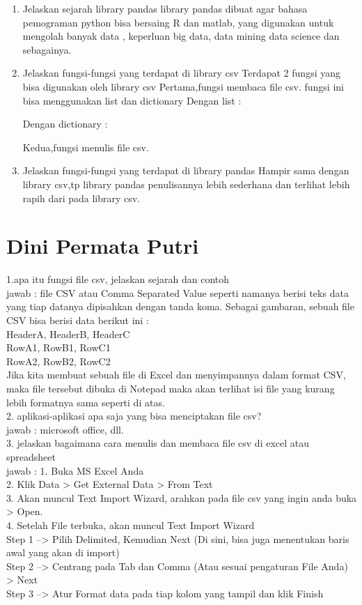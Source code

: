 \begin{enumerate}
    \item Jelaskan sejarah library pandas
    library pandas dibuat agar bahasa pemograman python bisa bersaing R dan matlab, yang digunakan untuk mengolah banyak data , keperluan big data, data mining data science dan sebagainya.
    \item Jelaskan fungsi-fungsi yang terdapat di library csv
    Terdapat 2 fungsi yang bisa digunakan oleh library csv
    Pertama,fungsi membaca file csv.
    fungsi ini bisa menggunakan list dan dictionary
    Dengan list :
    
    Dengan dictionary :
    
    Kedua,fungsi menulis file csv.
    
    \item Jelaskan fungsi-fungsi yang terdapat di library pandas
    Hampir sama dengan library csv,tp library pandas penulisannya lebih sederhana dan terlihat lebih rapih dari pada library csv.
    
\end{enumerate}
\section{Dini Permata Putri}
1.apa itu fungsi file csv, jelaskan sejarah dan contoh\\
jawab : file CSV atau Comma Separated Value seperti namanya berisi teks data yang tiap datanya dipisahkan dengan tanda koma. Sebagai gambaran, sebuah file CSV bisa berisi data berikut ini :\\
HeaderA, HeaderB, HeaderC\\
RowA1, RowB1, RowC1\\
RowA2, RowB2, RowC2\\
Jika kita membuat sebuah file di Excel dan menyimpannya dalam format CSV, maka file tersebut dibuka di Notepad maka akan terlihat isi file yang kurang lebih formatnya sama seperti di atas.\\

2. aplikasi-aplikasi apa saja yang bisa menciptakan file csv?\\
jawab : microsoft office, dll.\\

3. jelaskan bagaimana cara menulis dan membaca file csv di excel atau spreadsheet\\
jawab : 1. Buka MS Excel Anda\\
2. Klik Data > Get External Data > From Text\\ 
3. Akan muncul Text Import Wizard, arahkan pada file csv yang ingin anda buka > Open.\\
4. Setelah File terbuka, akan muncul Text Import Wizard\\
Step 1 –> Pilih Delimited, Kemudian Next (Di sini, bisa juga menentukan baris awal yang akan di import)\\
Step 2 –> Centrang pada Tab dan Comma (Atau sesuai pengaturan File Anda) > Next\\
Step 3 –> Atur Format data pada tiap kolom yang tampil dan klik Finish\\

